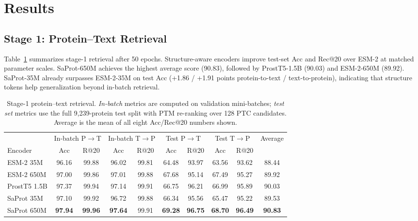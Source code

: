 \documentclass[conference]{IEEEtran}
\newcommand{\best}[1]{\textbf{#1}}
\begin{document}
\section{Results}
\label{sec:results}

\subsection{Stage 1: Protein--Text Retrieval}

Table~\ref{tab:stage1-main} summarizes stage-1 retrieval after 50 epochs.
Structure-aware encoders improve test-set Acc and Rec@20 over ESM-2 at matched parameter scales.
SaProt-650M achieves the highest average score (90.83), followed by ProstT5-1.5B (90.03) and ESM-2-650M (89.92).
SaProt-35M already surpasses ESM-2-35M on test Acc (+1.86 / +1.91 points protein-to-text / text-to-protein), indicating that structure tokens help generalization beyond in-batch retrieval.

\begin{table}[t]
  \caption{Stage-1 protein--text retrieval. \emph{In-batch} metrics are computed on validation mini-batches; \emph{test set} metrics use the full 9{,}239-protein test split with PTM re-ranking over 128 PTC candidates. Average is the mean of all eight Acc/Rec@20 numbers shown.}
  \label{tab:stage1-main}
  \centering
  \small
  \setlength{\tabcolsep}{4pt}
  \begin{tabular}{l cc cc cc cc c}
    \toprule
    & \multicolumn{2}{c}{In-batch P$\rightarrow$T} & \multicolumn{2}{c}{In-batch T$\rightarrow$P}
    & \multicolumn{2}{c}{Test P$\rightarrow$T} & \multicolumn{2}{c}{Test T$\rightarrow$P} & Average \\
    \cmidrule(lr){2-3}\cmidrule(lr){4-5}\cmidrule(lr){6-7}\cmidrule(lr){8-9}
    Encoder & Acc & R@20 & Acc & R@20 & Acc & R@20 & Acc & R@20 & \\
    \midrule
    ESM-2 35M   & 96.16 & 99.88 & 96.02 & 99.81 & 64.48 & 93.97 & 63.56 & 93.62 & 88.44 \\
    ESM-2 650M  & 97.00 & 99.86 & 97.01 & 99.88 & 67.68 & 95.14 & 67.49 & 95.27 & 89.92 \\
    ProstT5 1.5B & 97.37 & 99.94 & 97.14 & 99.91 & 66.75 & 96.21 & 66.99 & 95.89 & 90.03 \\
    SaProt 35M  & 97.10 & 99.92 & 96.72 & 99.88 & 66.34 & 95.56 & 65.47 & 95.22 & 89.53 \\
    SaProt 650M & \best{97.94} & \best{99.96} & \best{97.64} & 99.91 & \best{69.28} & \best{96.75} & \best{68.70} & \best{96.49} & \best{90.83} \\
    \bottomrule
  \end{tabular}
\end{table}
\end{document}
